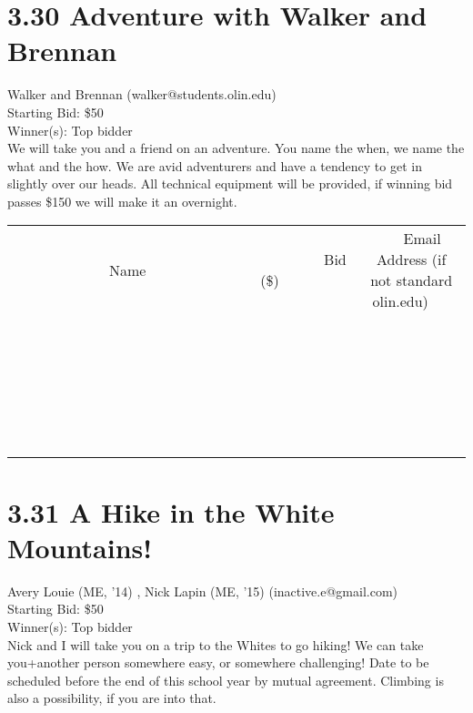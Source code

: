 \documentclass[11pt]{article}
\begin{document}
\section*{3.30 Adventure with Walker and Brennan}
Walker and Brennan (walker@students.olin.edu) \\
Starting Bid: \$50 \\
Winner(s): 
Top bidder \\
We will take you and a friend on an adventure. You name the when, we name the what and the how. We are avid adventurers and have a tendency to get in slightly over our heads. All technical equipment will be provided, if winning bid passes \$150 we will make it an overnight. \\[6ex]
\begin{tabular}{c c c}
~~~~~~~~~~~~~Name~~~~~~~~~~~~~ & ~~~~~~~~~Bid (\$)~~~~~~~~~ & ~~~Email Address (if not standard olin.edu)~~~ \\
 & & \\
\hline
 & & \\
\hline
 & & \\
\hline
 & & \\
\hline
 & & \\
\hline
 & & \\
\hline
 & & \\
\hline
 & & \\
\hline
 & & \\
\hline
 & & \\
\hline
 & & \\
\hline
 & & \\
\hline
 & & \\
\hline
 & & \\
\hline
 & & \\
\hline
 & & \\
\hline
 & & \\
\hline
 & & \\
\hline
 & & \\
\hline
 & & \\
\hline
 & & \\
\hline
 & & \\
\hline
 & & \\
\hline
 & & \\
\hline
 & & \\
\hline
 & & \\
\hline
\end{tabular}
\clearpage
\section*{3.31 A Hike in the White Mountains!}
Avery Louie (ME, '14) , Nick Lapin (ME, '15) (inactive.e@gmail.com) \\
Starting Bid: \$50 \\
Winner(s): 
Top bidder \\
Nick and I will take you on a trip to the Whites to go hiking!  We can take you+another person somewhere easy, or somewhere challenging!  Date to be scheduled before the end of this school year by mutual agreement.  Climbing is also a possibility, if you are into that.
\end{document}

